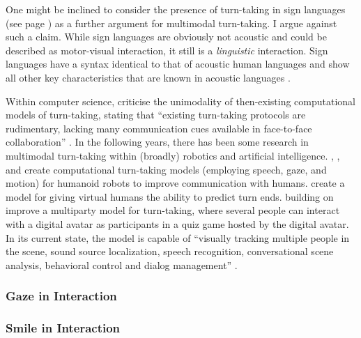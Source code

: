 One might be inclined to consider the presence of turn-taking in sign languages (see page ) as a further argument for multimodal turn-taking.
I argue against such a claim.
While sign languages are obviously not acoustic and could be described as motor-visual interaction, it still is a \emph{linguistic} interaction.
Sign languages have a syntax identical to that of acoustic human languages and show all other key characteristics that are known in acoustic languages \citep{stokoe_sign_2005}.

Within computer science, \citet{chan_designing_2008} criticise the unimodality of then-existing computational models of turn-taking, stating that ``existing turn-taking protocols are rudimentary, lacking many communication cues available in face-to-face collaboration'' \citep[]{chan_designing_2008}.
In the following years, there has been some research in multimodal turn-taking within (broadly) robotics and artificial intelligence.
\citet{chao_simon_2011}, \citet{chao_timing_2012}, and \citet{chao_timingmultimodal_2012} create computational turn-taking models (employing speech, gaze, and motion) for humanoid robots to improve communication with humans.
\citet{huang_multimodal_2011} create a model for giving virtual humans the ability to predict turn ends.
\citet{bohus_multiparty_2011}\dash building on \citet{bohus_computational_2010,bohus_facilitating_2010}\dash improve a multiparty model for turn-taking, where several people can interact with a digital avatar as participants in a quiz game hosted by the digital avatar.
In its current state, the model is capable of ``visually tracking multiple people in the scene, sound source localization, speech recognition, conversational scene analysis, behavioral control and dialog management'' \citep[]{bohus_multiparty_2011}.




\subsubsection{Gaze in Interaction}
\subsubsection{Smile in Interaction}

